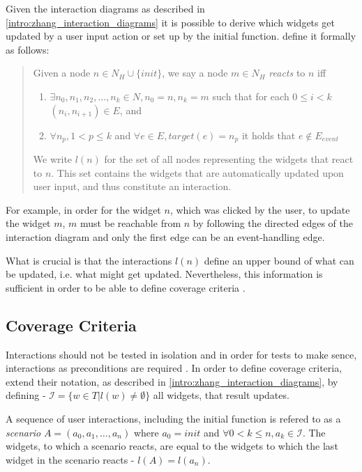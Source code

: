 Given the interaction diagrams as described in \ref{intro:zhang_interaction_diagrams} it is possible to derive which widgets get updated by a user input action or set up by the initial function. \textcite{zhang2019scenario} define it formally as follows:
\begin{quote}
\label{quote:interactions}
Given a node $n \in N_H \cup \{init\}$, we say a node $m \in N_H$ \textit{reacts} to $n$ iff
  \begin{enumerate}
      \item $\exists n_0,n_1,n_2, \ldots,n_k \in N, n_0=n,n_k=m$ such that for each $0 \leq i < k  $ $(n_i,n_{i+1}) \in E$, and 
      \item $\forall n_p, 1 < p \leq k$ and $\forall e \in E, target(e)= n_p$ it holds that $e \notin E_{event}$  
  \end{enumerate}
  We write $l(n)$ for the set of all nodes representing the widgets that react to $n$. This set contains the widgets that are automatically updated upon user input,
  and thus constitute an interaction.
  \end{quote}

For example, in order for the widget $n$, which was clicked by the user, to update the widget $m$, $m$ must be reachable from $n$ by following the directed edges of the interaction diagram and only the first edge can be an event-handling edge.

What is crucial is that the interactions $l(n)$ define an upper bound of what can be updated, i.e. what might get updated. Nevertheless, this information is sufficient in order to be able to define coverage criteria \parencite{zhang2019scenario}.

\subsection{Coverage Criteria}
Interactions should not be tested in isolation and in order for tests to make sence, interactions as preconditions are required \parencite{zhang2019scenario}. 
In order to define coverage criteria, \textcite{zhang2019scenario} extend their notation, as described in \ref{intro:zhang_interaction_diagrams}, by defining - $\mathcal{I}  = \{w\in T | l(w) \neq \emptyset \}$ all widgets, that result updates.

A sequence of user interactions, including the initial function is refered to as a \textit{scenario} $A=(a_0,a_1,\ldots, a_n)$ where $a_0=init$ and $\forall0 < k \leq n, a_k \in \mathcal{I}$. The widgets, to which a scenario reacts, are equal to the widgets to which the last widget in the scenario reacts - $l(A)=l(a_n)$. 


